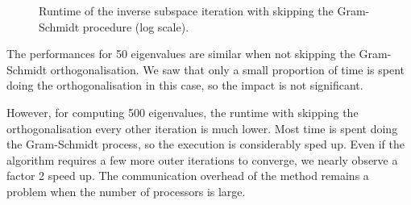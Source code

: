 \begin{figure}[H]
  \centering
  
  \caption{Runtime of the inverse subspace iteration with skipping the Gram-Schmidt procedure (log scale).}
\end{figure}

The performances for 50 eigenvalues are similar when not skipping the Gram-Schmidt orthogonalisation.
We saw that only a small proportion of time is spent doing the orthogonalisation in this case, so the impact is not significant.

However, for computing 500 eigenvalues, the runtime with skipping the orthogonalisation every other iteration is much lower.
Most time is spent doing the Gram-Schmidt process, so the execution is considerably sped up.
Even if the algorithm requires a few more outer iterations to converge, we nearly observe a factor 2 speed up.
The communication overhead of the method remains a problem when the number of processors is large.
